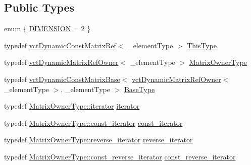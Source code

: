 \subsection*{Public Types}
\begin{DoxyCompactItemize}
\item 
enum \{ \hyperlink{group__cisst_vector_gga79a3214fbb027346f5ba60336c95c1faa078cb772f47aba74a3233d177914f8fa}{D\+I\+M\+E\+N\+S\+I\+O\+N} = 2
 \}
\item 
typedef \hyperlink{classvct_dynamic_const_matrix_ref}{vct\+Dynamic\+Const\+Matrix\+Ref}$<$ \+\_\+element\+Type $>$ \hyperlink{classvct_dynamic_const_matrix_ref_a9c784be5ec51408ff2830ef67f2c01c8}{This\+Type}
\item 
typedef \hyperlink{classvct_dynamic_matrix_ref_owner}{vct\+Dynamic\+Matrix\+Ref\+Owner}$<$ \+\_\+element\+Type $>$ \hyperlink{classvct_dynamic_const_matrix_ref_a86a40c99d49dbdb2edd71bfb82ee105b}{Matrix\+Owner\+Type}
\item 
typedef \hyperlink{classvct_dynamic_const_matrix_base}{vct\+Dynamic\+Const\+Matrix\+Base}$<$ \hyperlink{classvct_dynamic_matrix_ref_owner}{vct\+Dynamic\+Matrix\+Ref\+Owner}$<$ \+\_\+element\+Type $>$, \+\_\+element\+Type $>$ \hyperlink{classvct_dynamic_const_matrix_ref_a0e57e53f6e3703384598d165b430f0e8}{Base\+Type}
\item 
typedef \hyperlink{classvct_dynamic_matrix_ref_owner_aaf9f6aaf86c05aec0bcd354d40c11863}{Matrix\+Owner\+Type\+::iterator} \hyperlink{classvct_dynamic_const_matrix_ref_ab330f3add78ec03ac1f50861ae7d12ac}{iterator}
\item 
typedef \hyperlink{classvct_dynamic_matrix_ref_owner_a7a8df19473cc2e95e25c4d1bf4bacbe4}{Matrix\+Owner\+Type\+::const\+\_\+iterator} \hyperlink{classvct_dynamic_const_matrix_ref_ad5222f7776fb22e1fbf36980d1b2022b}{const\+\_\+iterator}
\item 
typedef \hyperlink{classvct_dynamic_matrix_ref_owner_a133b22e9f6b4e7a20998ad3db72ed6c3}{Matrix\+Owner\+Type\+::reverse\+\_\+iterator} \hyperlink{classvct_dynamic_const_matrix_ref_a05e475dde6f7edcd23536c620da182db}{reverse\+\_\+iterator}
\item 
typedef \hyperlink{classvct_dynamic_matrix_ref_owner_a50c3b985899b0d6cb2f9fab9f8305207}{Matrix\+Owner\+Type\+::const\+\_\+reverse\+\_\+iterator} \hyperlink{classvct_dynamic_const_matrix_ref_aab47ab9afbf2163300fb700fa5240550}{const\+\_\+reverse\+\_\+iterator}
\end{DoxyCompactItemize}
